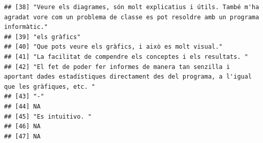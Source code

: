 \documentclass[
]{article}
\begin{document}
\begin{verbatim}
## [38] "Veure els diagrames, són molt explicatius i útils. També m'ha agradat vore com un problema de classe es pot resoldre amb un programa informàtic."                                                                                                                           
## [39] "els gràfics"                                                                                                                                                                                                                                                                
## [40] "Que pots veure els gràfics, i això es molt visual."                                                                                                                                                                                                                         
## [41] "La facilitat de compendre els conceptes i els resultats. "                                                                                                                                                                                                                  
## [42] "El fet de poder fer informes de manera tan senzilla i aportant dades estadístiques directament des del programa, a l'igual que les gràfiques, etc. "                                                                                                                        
## [43] "-"                                                                                                                                                                                                                                                                          
## [44] NA                                                                                                                                                                                                                                                                           
## [45] "Es intuitivo. "                                                                                                                                                                                                                                                             
## [46] NA                                                                                                                                                                                                                                                                           
## [47] NA
\end{verbatim}
\end{document}
